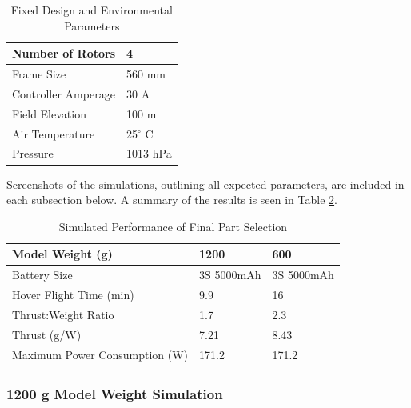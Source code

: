 \begin{table}[H]
\label{env_param}
\centering
\begin{tabular}{|l|l|}
\hline
Number of Rotors    & 4        \\ \hline
Frame Size          & 560 mm   \\ \hline
Controller Amperage & 30 A     \\ \hline
Field Elevation     & 100 m    \\ \hline
Air Temperature     & 25$^{\circ}$ C     \\ \hline
Pressure            & 1013 hPa \\ \hline
\end{tabular}
\caption{Fixed Design and Environmental Parameters}
\end{table}

Screenshots of the simulations, outlining all expected parameters, are included in each subsection below. A summary of the results is seen in Table \ref{summary}.

\begin{table}[]
\centering
\begin{tabular}{|l|l|l|}
\hline
\textbf{Model Weight (g)}              & \textbf{1200}       & \textbf{600}        \\ \hline
Battery Size                  & 3S 5000mAh & 3S 5000mAh \\ \hline
Hover Flight Time (min)       & 9.9        & 16         \\ \hline
Thrust:Weight Ratio           & 1.7        & 2.3        \\ \hline
Thrust (g/W)                  & 7.21       & 8.43       \\ \hline
Maximum Power Consumption (W) & 171.2      & 171.2      \\ \hline
\end{tabular}
\caption{Simulated Performance of Final Part Selection}
\label{summary}
\end{table}

\subsubsection{1200 g Model Weight Simulation}

